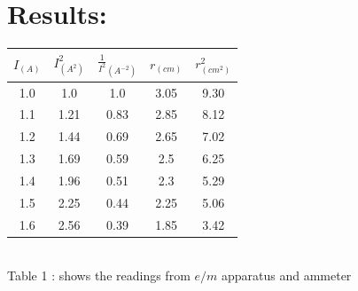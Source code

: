 \documentclass[10pt,a4paper]{report}
\begin{document}
\section*{\textbf{{Results:}}}
	{\Large 
		\begin{center}
			\begin{tabular}{|c|c|c||c|c|}
				\hline%
				$I_{(A)}$ & $I^{2}_{(A^{2})}$ & $\frac{1}{I^{2}}_{(A^{-2})}$ & $r_{(cm)}$ & $r^{2}_{(cm^{2})}$ \\
				\hline
				1.0 & 1.0 & 1.0 & 3.05 & 9.30 \\
				\hline
				1.1 & 1.21 & 0.83 & 2.85 & 8.12 \\
				\hline
				1.2 & 1.44 & 0.69 & 2.65 & 7.02 \\
				\hline
				1.3 & 1.69 & 0.59 & 2.5 & 6.25 \\
				\hline
				1.4 & 1.96 & 0.51 & 2.3 & 5.29 \\
				\hline
				1.5 & 2.25 & 0.44 & 2.25 & 5.06 \\
				\hline
				1.6 & 2.56 & 0.39 & 1.85 & 3.42 \\
				\hline
			\end{tabular}\\
			Table 1 : shows the readings from $e/m$ apparatus and ammeter \\
		\end{center}}
	
\end{document}

